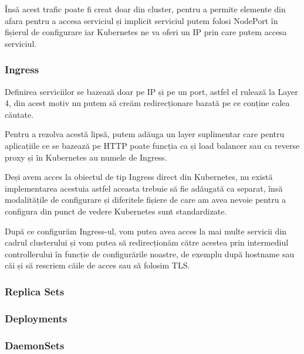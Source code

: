 Însă acest trafic poate fi creat doar din cluster, pentru a permite elemente din afara 
pentru a accesa serviciul și implicit serviciul putem folosi NodePort în fișierul de 
configurare iar Kubernetes ne va oferi un IP prin care putem accesa serviciul.

\subsubsection{Ingress}

Definirea serviciilor se bazează doar pe IP și pe un port, astfel el rulează la 
Layer 4, din acest motiv nu putem să creăm redirecționare bazată pe ce conține 
calea căutate.

Pentru a rezolva acestă lipsă, putem adăuga un layer suplimentar care pentru 
aplicațiile ce se bazează pe HTTP poate funcția ca și load balancer sau ca reverse proxy
și în Kubernetes au numele de Ingress.

Deși avem acces la obiectul de tip Ingress direct din Kubernetes, 
nu există implementarea acestuia astfel aceasta trebuie să fie adăugată ca separat,
însă modalitățile de configurare și diferitele fișiere de care am avea nevoie pentru
a configura din punct de vedere Kubernetes sunt standardizate.

După ce configurăm Ingress-ul, vom putea avea acces la mai multe servicii din cadrul
clusterului și vom putea să redirecționăm către acestea prin intermediul controllerului
în funcție de configurările noastre, de exemplu după hostname sau căi și să rescriem
căile de acces sau să folosim TLS.

\subsubsection{Replica Sets}

\subsubsection{Deployments}

\subsubsection{DaemonSets}

